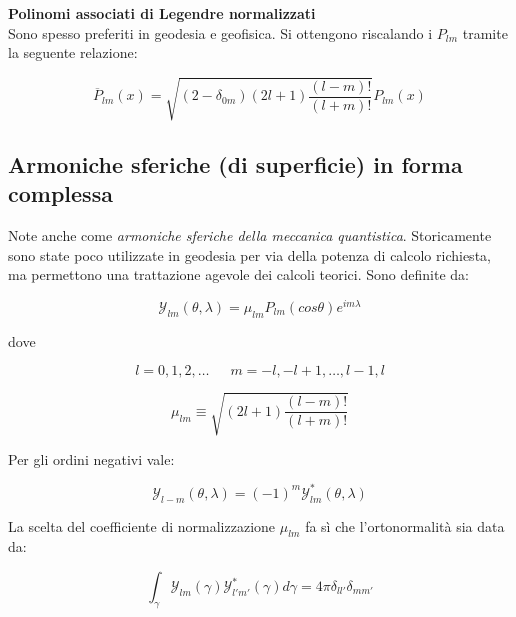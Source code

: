 \documentclass[a4paper,12pt]{book}
\begin{document}
\noindent \textcolor{colore7}{\textbf{Polinomi associati di Legendre normalizzati}}\\

\noindent
Sono spesso preferiti in geodesia e geofisica.
Si ottengono riscalando i $P_{lm}$ tramite la seguente relazione:

\begin{equation}
    \overline{P}_{lm} (x) = \sqrt{(2 - \delta _{0m}) (2l + 1) \frac{(l-m)!}{(l+m)!}} P_{lm} (x)
\end{equation}
 
\subsection{\textcolor{colore7}{Armoniche sferiche (di superficie) in forma complessa}}

Note anche come \textit{armoniche sferiche della meccanica quantistica}.
Storicamente sono state poco utilizzate in geodesia per via della potenza di calcolo richiesta,
ma permettono una trattazione agevole dei calcoli teorici.
Sono definite da:

\begin{equation}
    \mathcal{Y}_{lm} (\theta , \lambda) = \mu _{lm} P_{lm} (cos \theta) e^{im \lambda}
    \label{eq:armoniche_sferiche_complesse}
\end{equation}

\noindent
dove

\begin{equation*}
    l = 0, 1, 2, \dots \,\,\,\,\,\,\,\,\, m = -l, -l+1, \dots , l-1, l
\end{equation*}

\begin{equation*}
    \mu_{lm} \equiv \sqrt{(2l+1) \frac{(l-m)!}{(l+m)!}}
\end{equation*}

\noindent Per gli ordini negativi vale:

\begin{equation}
    \mathcal{Y}_{l-m} (\theta , \lambda) = (-1)^m \mathcal{Y}^*_{lm} (\theta , \lambda) 
\end{equation}

\noindent La scelta del coefficiente di normalizzazione $\mu_{lm}$ fa sì che l'ortonormalità sia data da:

\begin{equation}
    \int_\gamma \mathcal{Y}_{lm} (\gamma) \mathcal{Y}^*_{l'm'} (\gamma) d\gamma = 4 \pi \delta_{ll'} \delta_{mm'} 
\end{equation}
\end{document}
